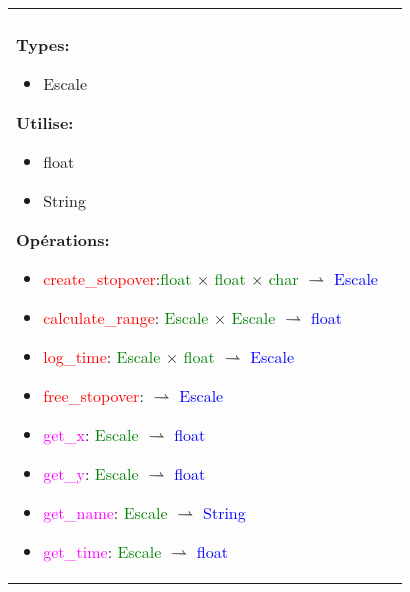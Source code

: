 \documentclass[a4paper, 11pt, oneside]{article}
\begin{document}
		\begin{tabular}{|p{17cm}|c}
			\hline
			\\
			
			\textbf{Types:}
				\begin{itemize}
					\item[] Escale
				\end{itemize}
			
			\textbf{Utilise:}
				\begin{itemize}
					\item[] float
					\item[] String
				\end{itemize}
			
			\textbf{Opérations\footnotemark{}:}
				\begin{itemize}
					\item[] \textcolor{red}{create\_stopover}:\textcolor{green}{float} $\times$ \textcolor{green}{float} $\times$ \textcolor{green}{char} $\rightharpoonup$ \textcolor{blue}{Escale}
					\item[] \textcolor{red}{calculate\_range}: \textcolor{green}{Escale} $\times$ \textcolor{green}{Escale} $\rightharpoonup$ \textcolor{blue}{float}
					\item[] \textcolor{red}{log\_time}: \textcolor{green}{Escale} $\times$ \textcolor{green}{float} $\rightharpoonup$ \textcolor{blue}{Escale}
					\item[] \textcolor{red}{free\_stopover}: $\rightharpoonup$ \textcolor{blue}{Escale}
					\item[] \textcolor{magenta}{get\_x}: \textcolor{green}{Escale} $\rightharpoonup$ \textcolor{blue}{float}
					\item[] \textcolor{magenta}{get\_y}: \textcolor{green}{Escale} $\rightharpoonup$ \textcolor{blue}{float}
					\item[] \textcolor{magenta}{get\_name}: \textcolor{green}{Escale} $\rightharpoonup$ \textcolor{blue}{String}
					\item[] \textcolor{magenta}{get\_time}: \textcolor{green}{Escale} $\rightharpoonup$ \textcolor{blue}{float}
				\end{itemize}
			

\end{tabular}
\end{document}
